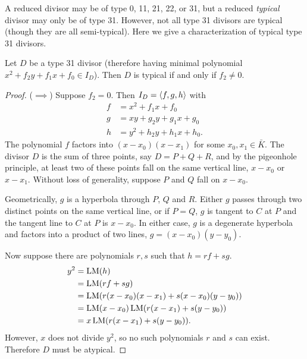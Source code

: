 A reduced divisor may be of type 0, 11, 21, 22, or 31,
but a reduced \emph{typical} divisor may only be of type 31.
However, not all type 31 divisors are typical (though they are all semi-typical).
Here we give a characterization of typical type 31 divisors.
\begin{theorem}
  \label{thm_typical_type_31_divisors}
  Let $D$ be a type 31 divisor
  (therefore having minimal polynomial $x^2 + f_2y + f_1x + f_0 \in I_D$).
  Then $D$ is typical if and only if $f_2 \neq 0$.
\end{theorem}
\begin{proof}
  ($\implies$)
  Suppose $f_2 = 0$.
  Then $I_D = \left\langle f, g, h \right\rangle$ with
  \begin{align*}
    f &= x^2 + f_1x + f_0 \\
    g &= xy  + g_2y + g_1x + g_0 \\
    h &= y^2 + h_2y + h_1x + h_0.
  \end{align*}
  The polynomial $f$ factors into $(x - x_0)(x - x_1)$ for some $x_0, x_1 \in \bar K$.
  The divisor $D$ is the sum of three points, say $D = P + Q + R$, and by the pigeonhole principle,
  at least two of these points fall on the same vertical line, $x - x_0$ or $x - x_1$.
  Without loss of generality, suppose $P$ and $Q$ fall on $x - x_0$.
  
  Geometrically, $g$ is a hyperbola through $P$, $Q$ and $R$.
  Either $g$ passes through two distinct points on the same vertical line,
  or if $P = Q$, $g$ is tangent to $C$ at $P$ and the tangent line to $C$ at $P$ is $x - x_0$.
  In either case, $g$ is a degenerate hyperbola and factors into a product of two lines, $g = (x - x_0)(y - y_0)$.
  
  Now suppose there are polynomials $r, s$ such that $h = rf + sg$.
  \begin{align*}
    y^2 &= \operatorname{LM}(h) \\
        &= \operatorname{LM}(rf + sg) \\
        &= \operatorname{LM}(r(x - x_0)(x - x_1) + s(x - x_0)(y - y_0)) \\
        &= \operatorname{LM}(x - x_0)\operatorname{LM}(r(x - x_1) + s(y - y_0)) \\
        &= x\operatorname{LM}(r(x - x_1) + s(y - y_0)).
  \end{align*}
  However, $x$ does not divide $y^2$, so no such polynomials $r$ and $s$ can exist.
  Therefore $D$ must be atypical.
  

\end{proof}
